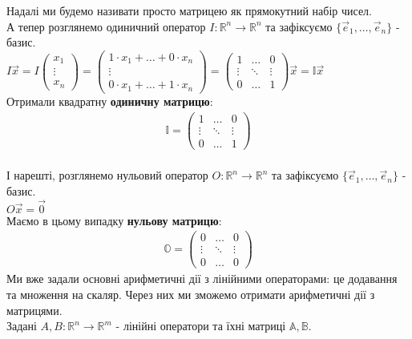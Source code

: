 \documentclass[a4paper, 10pt]{article}
\theoremstyle{theoremdd}
\begin{document}
	Надалі ми будемо називати просто матрицею як прямокутний набір чисел.
	\bigskip \\
	А тепер розглянемо одиничний оператор $I: \mathbb{R}^n \to \mathbb{R}^n$ та зафіксуємо $\{\vec{e}_1, \dots, \vec{e}_n\}$ - базис.\\
	$I \vec{x} = I \begin{pmatrix}
	x_1 \\ \vdots \\ x_n
	\end{pmatrix} = \begin{pmatrix}
	1 \cdot x_1 + \dots + 0 \cdot x_n \\ \vdots \\ 0 \cdot x_1 + \dots + 1 \cdot x_n
	\end{pmatrix} = \begin{pmatrix}
	1 & \dots & 0 \\
	\vdots & \ddots & \vdots \\
	0 & \dots & 1
	\end{pmatrix} \vec{x} = \mathbb{I} \vec{x}$
	\bigskip \\
	Отримали квадратну \textbf{одиничну матрицю}:
	\begin{align*}
	\mathbb{I} = \begin{pmatrix}
	1 & \dots & 0 \\
	\vdots & \ddots & \vdots \\
	0 & \dots & 1
	\end{pmatrix}
	\end{align*}
	\bigskip \\
	І нарешті, розглянемо нульовий оператор $O: \mathbb{R}^n \to \mathbb{R}^n$ та зафіксуємо $\{\vec{e}_1, \dots, \vec{e}_n\}$ - базис.\\
	$O \vec{x} = \vec{0}$\\
	Маємо в цьому випадку \textbf{нульову матрицю}:
	\begin{align*}
	\mathbb{O} = \begin{pmatrix}
	0 & \dots & 0 \\
	\vdots & \ddots & \vdots \\
	0 & \dots & 0
	\end{pmatrix}
	\end{align*}
	Ми вже задали основні арифметичні дії з лінійними операторами: це додавання та множення на скаляр. Через них ми зможемо отримати арифметичні дії з матрицями.\\
	Задані $A,B: \mathbb{R}^n \to \mathbb{R}^m$ - лінійні оператори та їхні матриці $\mathbb{A}, \mathbb{B}$.\\
\end{document}
